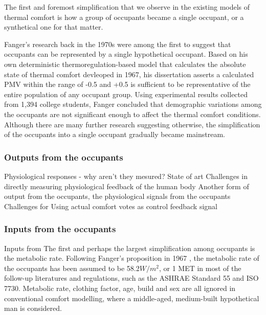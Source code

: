 
The first and foremost simplification that we observe in the existing models of thermal comfort is how a group of occupants became a single occupant, or a synthetical one for that matter.

Fanger's research back in the 1970s were among the first to suggest that occupants can be represented by a single hypothetical occupant\cite{fanger_thermal_1970}. Based on his own deterministic thermoregulation-based model that calculates the absolute state of thermal comfort devleoped in 1967\cite{fanger_calculation_1967}, his dissertation asserts a calculated PMV within the range of -0.5 and +0.5 is sufficient to be representative of the entire population of any occupant group. Using experimental results collected from 1,394 college students, Fanger concluded that demographic variations among the occupants are not significant enough to affect the thermal comfort conditions. Although there are many further research suggesting otherwise\cite{kingma_energy_2015,wang_individual_2018}, the simplification of the occupants into a single occupant gradually became mainstream\cite{ansi/ashrae_standard_2017}.


\subsubsection{Outputs from the occupants}
        Physiological responses - why aren't they mesured?
        State of art
        Challenges in directly measuring physiological feedback of the human body
        Another form of output from the occupants, the physiological signals from the occupants 
        Challenges for Using actual comfort votes as control feedback signal

\subsubsection{Inputs from the occupants}
	Inputs from 
	The first and perhaps the largest simplification among occupants is the metabolic rate. Following Fanger's proposition in 1967 \cite{fanger_calculation_1967}, the metabolic rate of the occupants has been assumed to be 58.2$W/m^2$, or 1 MET in most of the follow-up literatures and regulations, such as the ASHRAE Standard 55\cite{ashrae_ansi/ashrae_2013} and ISO 7730\cite{iso_iso_2005}. 
        Metabolic rate, clothing factor, age, build and sex are all ignored in conventional comfort modelling, where a middle-aged, medium-built hypothetical man is considered.
